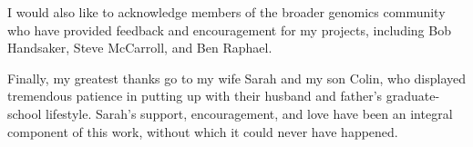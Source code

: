 \documentclass [11pt] {report}
\begin{document}
I would also like to acknowledge members of the broader genomics community who have provided feedback and encouragement for my projects, including Bob Handsaker, Steve McCarroll, and Ben Raphael.

Finally, my greatest thanks go to my wife Sarah and my son Colin, who displayed tremendous patience in putting up with their husband and father's graduate-school lifestyle. Sarah's support, encouragement, and love have been an integral component of this work, without which it could never have happened.
\vfill



\afterpreface



%
\body





















\begin{singlespace}

\end{singlespace}


%
\end{document}
